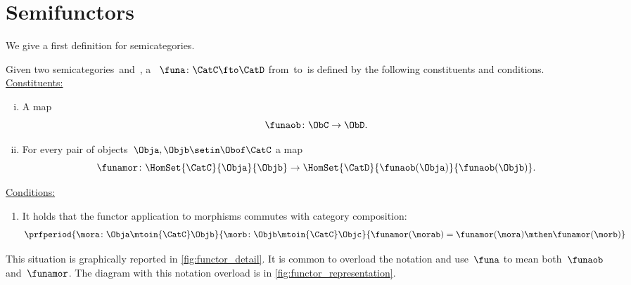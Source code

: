 
\section{Semifunctors}

We give a first definition for semicategories.


\begin{ctdefinition}
    \label{def:semi-functor}
    Given two semicategories~\CatC and~\CatD, a \emph{}~$\funa\colon \CatC\fto \CatD$ from~\CatC to~\CatD is defined by the following constituents and conditions.
    \\
    \underline{Constituents:}
    \begin{enumerate}
        [i)]
        \item A map
              \begin{equation}
                  \funaob \colon \ObC \to \ObD.
              \end{equation}
        \item For every pair of objects~$\Obja, \Objb\setin \Obof\CatC$ a map
              \begin{equation}
                  \funamor\colon \HomSet{\CatC}{\Obja}{\Objb} \to \HomSet{\CatD}{\funaob(\Obja)}{\funaob(\Objb)}.
              \end{equation}
    \end{enumerate}
    \underline{Conditions:}
    \begin{enumerate}
        \item It holds that the functor application to morphisms commutes with category composition:
              \begin{equation}
                  \prfperiod{
                      \mora\colon \Obja \mtoin{\CatC} \Objb
                  }{
                      \morb\colon \Objb \mtoin{\CatC} \Objc
                  }{
                      \funamor(\morab)=\funamor(\mora)\mthen \funamor(\morb)
                  }
              \end{equation}
    \end{enumerate}
\end{ctdefinition}

This situation is graphically reported in \cref{fig:functor_detail}.
%
It is common to overload the notation and use~$\funa$ to mean both~$\funaob$ and~$\funamor$.
The diagram with this notation overload is in \cref{fig:functor_representation}.

